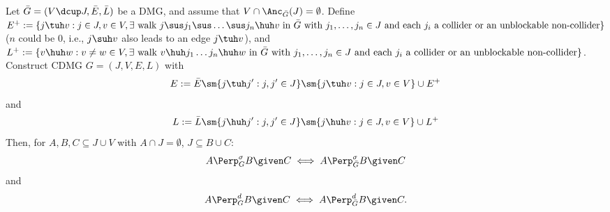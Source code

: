 \begin{Prp}
  Let $\bar{G}=(V \dcup J,\bar{E},\bar{L})$ be a DMG, and assume that $V \cap \Anc_{\bar{G}}(J) = \emptyset$.
  Define 
  $E^+ := \{j \tuh v : j \in J, v \in V, \exists \text{ walk } j \sus j_1 \sus \dots \sus j_n \huh v \text{ in } \bar{G} \text{ with } j_1,\dots,j_n \in J \text{ and each } j_i \text{ a collider or an unblockable non-collider}\}$
  ($n$ could be 0, i.e., $j \suh v$ also leads to an edge $j \tuh v$), and
  $L^+ := \{v \huh w : v \ne w \in V, \exists \text{ walk } v \huh j_1 \dots j_n \huh w \text{ in } \bar{G} \text{ with } j_1,\dots,j_n \in J \text{ and each } j_i \text{ a collider or an unblockable non-collider}\}$.
  Construct CDMG $G=(J,V,E,L)$ with 
  $$E := \bar{E} \sm \{j \tuh j' : j, j' \in J\} \sm \{j \tuh v : j \in J, v \in V \} \cup E^+$$
  and
  $$L := \bar{L} \sm \{j \huh j' : j, j' \in J\} \sm \{j \huh v : j \in J, v \in V \} \cup L^+$$
  Then, for $A, B, C \subseteq J \cup V$ with $A \cap J = \emptyset$, $J \subseteq B \cup C$:
  $$A \Perp_G^\sigma B \given C \iff A \Perp_{\bar{G}}^\sigma B \given C$$
  and
  $$A \Perp_G^d B \given C \iff A \Perp_{\bar{G}}^d B \given C.$$
\end{Prp}

